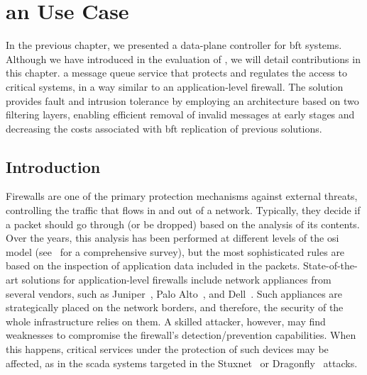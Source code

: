 \chapter{\sieveq an Use Case}
\label{chap:sieveq}

In the previous chapter, we presented \system a data-plane controller for \gls{bft} systems. 
Although we have introduced \sieveq in the evaluation of \system, we will detail \sieveq contributions in this chapter.
\sieveq a message queue service that protects and regulates the access to critical systems, in a way similar to an application-level firewall.
The solution provides fault and intrusion tolerance by employing an architecture based on two filtering layers, enabling efficient removal of invalid messages at early stages and decreasing the costs associated with \gls{bft} replication of previous solutions.


\section{Introduction}

Firewalls are one of the primary protection mechanisms against external threats, controlling the traffic that flows in and out of a network. 
Typically, they decide if a packet should go through (or be dropped) based on the analysis of its contents. 
Over the years, this analysis has been performed at different levels of the \gls{osi} model (see~\cite{Keromytis:2006} for a comprehensive survey), but the most sophisticated rules are based on the inspection of application data included in the packets.
State-of-the-art solutions for application-level firewalls include network appliances from several vendors, such as Juniper~\cite{juniper}, Palo Alto~\cite{paloalto}, and Dell~\cite{sonicwall}.
Such appliances are strategically placed on the network borders, and therefore, the security of the whole infrastructure relies on them.
A skilled attacker, however, may find weaknesses to compromise the firewall's detection/prevention capabilities.
When this happens, critical services under the protection of such devices may be affected, as in the \gls{scada} systems targeted in the Stuxnet~\cite{stuxnet:2010} or Dragonfly~\cite{dragonfly:2014} attacks.


